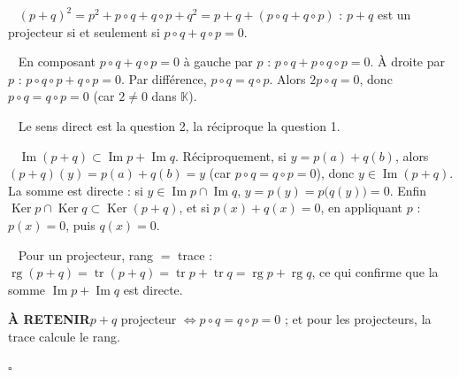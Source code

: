 \documentclass[a4paper,11pt]{article}
\numberwithin{equation}{section}
\numberwithin{figure}{section}
\numberwithin{table}{section}
\theoremstyle{enonce}
\theoremstyle{exemple}
\theoremstyle{remarque}
\newcommand{\K}{\mathbb{K}}
\newcommand{\rg}{\operatorname{rg}}
\newcommand{\retenir}[1]{\begin{retenirbox}{\sffamily\bfseries\footnotesize\color{Ocre}À RETENIR}\quad #1\end{retenirbox}}
\newcommand{\q}[1]{\par\smallskip\noindent{\sffamily\bfseries\color{Bleu}#1}\ }
\providecommand{\Ker}{\operatorname{Ker}}\renewcommand{\Im}{\operatorname{Im}}\providecommand{\tr}{\operatorname{tr}}\providecommand{\Sp}{\operatorname{Sp}}
\begin{document}
\q{1.} $(p+q)^2=p^2+p\circ q+q\circ p+q^2=p+q+(p\circ q+q\circ p)$ : $p+q$ est un projecteur si et seulement si $p\circ q+q\circ p=0$.
\q{2.} En composant $p\circ q+q\circ p=0$ à gauche par $p$ : $p\circ q+p\circ q\circ p=0$. À droite par $p$ : $p\circ q\circ p+q\circ p=0$.
Par différence, $p\circ q=q\circ p$. Alors $2p\circ q=0$, donc $p\circ q=q\circ p=0$ (car $2\neq0$ dans $\K$).
\q{3.} Le sens direct est la question 2, la réciproque la question 1.
\q{4.} $\Im(p+q)\subset\Im p+\Im q$. Réciproquement, si $y=p(a)+q(b)$, alors $(p+q)(y)=p(a)+q(b)=y$ (car $p\circ q=q\circ p=0$),
donc $y\in\Im(p+q)$. La somme est directe : si $y\in\Im p\cap\Im q$, $y=p(y)=p\big(q(y)\big)=0$. Enfin $\Ker p\cap\Ker q\subset\Ker(p+q)$,
et si $p(x)+q(x)=0$, en appliquant $p$ : $p(x)=0$, puis $q(x)=0$.
\q{5.} Pour un projecteur, rang $=$ trace : $\rg(p+q)=\tr(p+q)=\tr p+\tr q=\rg p+\rg q$, ce qui confirme que la somme
$\Im p+\Im q$ est directe.
\retenir{$p+q$ projecteur $\iff p\circ q=q\circ p=0$ ; et pour les projecteurs, la trace calcule le rang.}
\par\hfill\textcolor{BleuClair}{$\square$}\par
\end{document}
